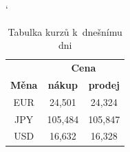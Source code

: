 \documentclass[11pt,a4paper]{article}
\begin{document}
\begin{table}[ht]
	\begin{center}	
	\catcode`
	\begin{tabular}{| c | c | c |} \hline 
		& \multicolumn{2}{|c|}{\textbf{Cena}}\\ \cline{2-3}
		\textbf{Měna} & \textbf{nákup} & \textbf{prodej}\\ \hline
		EUR & 24,501 & 24,324 \\
		JPY & 105,484 & 105,847 \\ \hline
		USD & 16,632 & 16,328 \\ \hline
	\end{tabular}
	\caption{Tabulka kurzů k~dnešnímu dni}
	\label{tab:1}
	\end{center}
\end{table}
\end{document}

